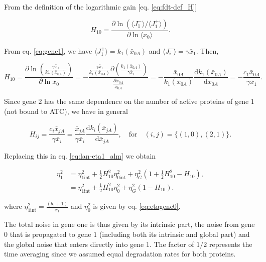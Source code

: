 From the definition of the logarithmic gain [eq. \eqref{eq:fdt-def_H}]

\begin{equation*}
  H_{10} = \frac{\partial \ln (\langle J_1^-\rangle/\langle J_1^+\rangle)}{\partial \ln \langle x_0\rangle}.
\end{equation*}

From eq. \eqref{eq:gene1}, we have $\langle J_1^+\rangle = k_1(\bar{x}_{0A})$ and $\langle J_i^-\rangle = \gamma \bar{x}_1$. Then,

\begin{equation*}
  H_{10} = \frac{\partial \ln\left(\frac{\gamma\bar{x}_1}{k1(\bar{x}_{0A})}\right)}{\partial \ln  \bar{x}_0} = -\frac{\frac{\gamma \bar{x}_1}{k_1(\bar{x}_{0A})}\partial\left(\frac{k_1(\bar{x}_{0A})}{\gamma \bar{x}_1}\right)}{\frac{\partial \bar{x}_{0A}}{\bar{x}_{0A}}} = -\frac{\bar{x}_{0A}}{k_1(\bar{x}_{0A})}\frac{\mathrm{d} k_1(\bar{x}_{0A})}{\mathrm{d} \bar{x}_{0A}} = -\frac{c_1 \bar{x}_{0A}}{\gamma\bar{x}_1}.
\end{equation*}

Since gene $2$ has the same dependence on the number of active proteins of gene $1$ (not bound to ATC), we have in general

\begin{equation}
  \label{lan-Hexp}
  H_{ij} = \frac{c_i \bar{x}_{jA}}{\gamma\bar{x}_i} = \frac{\bar{x}_{jA}}{\gamma\bar{x}_i}\frac{\mathrm{d}k_i(\bar{x}_{jA})}{\mathrm{d} \bar{x}_{jA}},\quad\text{for}\quad (i,j) = \{(1,0),(2,1)\}.
\end{equation}

Replacing this in eq. \eqref{eq:lan-eta1_alm} we obtain

\begin{equation}
  \label{eq:etagene1}
  \begin{split} 
    \eta_1^2 &= \eta_{1\text{int}}^2+\frac{1}{2}H_{10}^2\eta_{0\text{int}}^2+\eta_G^2\left(1+ \frac{1}{2}H_{10}^2-H_{10}\right), \\
    &= \eta_{1\text{int}}^2 + \frac{1}{2}H_{10}^2\eta_0^2+\eta_G^2\left(1-H_{10}\right).
  \end{split}
\end{equation}

where $\eta_{1\text{int}}^2 = \frac{(b_1+1)}{\bar{x_1}}$ and $\eta_0^2$ is given by eq. \eqref{eq:etagene0}.

The total noise in gene one is thus given by its intrinsic part, the noise from gene $0$ that is propagated to gene $1$ (including both its intrinsic and global part) and the global noise that enters directly into gene $1$. The factor of $1/2$ represents the time averaging since we assumed equal degradation rates for both proteins.

